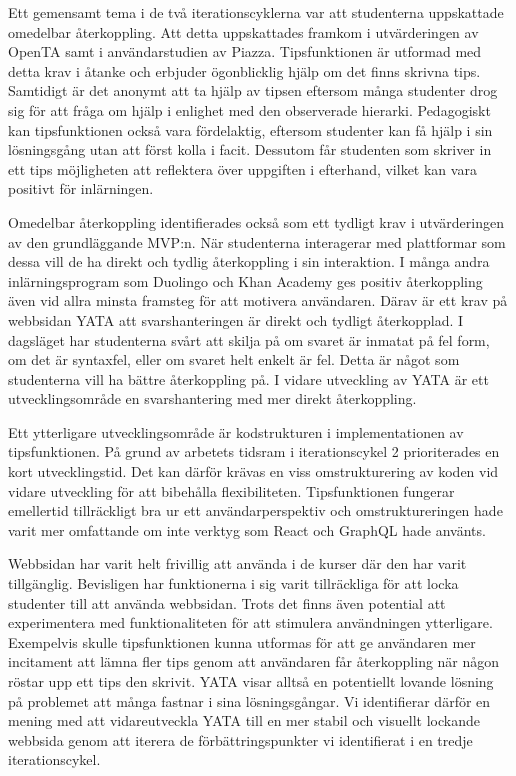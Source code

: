 Ett gemensamt tema i de två iterationscyklerna var att studenterna uppskattade omedelbar återkoppling. Att detta uppskattades framkom i utvärderingen av OpenTA samt i användarstudien av Piazza. Tipsfunktionen är utformad med detta krav i åtanke och erbjuder ögonblicklig hjälp om det finns skrivna tips. Samtidigt är det anonymt att ta hjälp av tipsen eftersom många studenter drog sig för att fråga om hjälp i enlighet med den observerade hierarki. Pedagogiskt kan tipsfunktionen också vara fördelaktig, eftersom studenter kan få hjälp i sin lösningsgång utan att först kolla i facit. Dessutom får studenten som skriver in ett tips möjligheten att reflektera över uppgiften i efterhand, vilket kan vara positivt för inlärningen.

Omedelbar återkoppling identifierades också som ett tydligt krav i utvärderingen av den grundläggande MVP:n. När studenterna interagerar med plattformar som dessa vill de ha direkt och tydlig återkoppling i sin interaktion. I många andra inlärningsprogram som Duolingo och Khan Academy ges positiv återkoppling även vid allra minsta framsteg för att motivera användaren. Därav är ett krav på webbsidan YATA att svarshanteringen är direkt och tydligt återkopplad. I dagsläget har studenterna svårt att skilja på om svaret är inmatat på fel form, om det är syntaxfel, eller om svaret helt enkelt är fel. Detta är något som studenterna vill ha bättre återkoppling på. I vidare utveckling av YATA är ett utvecklingsområde en svarshantering med mer direkt återkoppling.

Ett ytterligare utvecklingsområde är kodstrukturen i implementationen av tipsfunktionen. På grund av arbetets tidsram i iterationscykel 2 prioriterades en kort utvecklingstid. Det kan därför krävas en viss omstrukturering av koden vid vidare utveckling för att bibehålla flexibiliteten. Tipsfunktionen fungerar emellertid tillräckligt bra ur ett användarperspektiv och omstruktureringen hade varit mer omfattande om inte verktyg som React och GraphQL hade använts.

Webbsidan har varit helt frivillig att använda i de kurser där den har varit tillgänglig. Bevisligen har funktionerna i sig varit tillräckliga för att locka studenter till att använda webbsidan. Trots det finns även potential att experimentera med funktionaliteten för att stimulera användningen ytterligare. Exempelvis skulle tipsfunktionen kunna utformas för att ge användaren mer incitament att lämna fler tips genom att användaren får återkoppling när någon röstar upp ett tips den skrivit. YATA visar alltså en potentiellt lovande lösning på problemet att många fastnar i sina lösningsgångar. Vi identifierar därför en mening med att vidareutveckla YATA till en mer stabil och visuellt lockande webbsida genom att iterera de förbättringspunkter vi identifierat i en tredje iterationscykel. 



